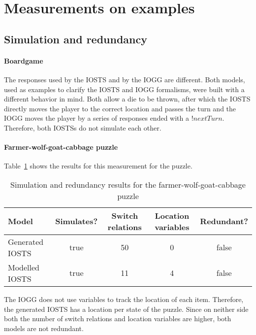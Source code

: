 \section{Measurements on examples}

\subsection{Simulation and redundancy}

\paragraph*{Boardgame}
The responses used by the IOSTS and by the IOGG are different. Both models, used as examples to clarify the IOSTS and IOGG formalisms, were built with a different behavior in mind. Both allow a die to be thrown, after which the IOSTS directly moves the player to the correct location and passes the turn and the IOGG moves the player by a series of responses ended with a $!nextTurn$. Therefore, both IOSTSs do not simulate each other.

\paragraph*{Farmer-wolf-goat-cabbage puzzle}
Table~\ref{tab:fwgc-simulate} shows the results for this measurement for the puzzle. 

\begin{table}[ht]
\begin{center}
\begin{tabular}{|l|c|c|c|c|}
\hline
\textbf{Model} & \textbf{Simulates?} & \textbf{Switch relations} & \textbf{Location variables} & \textbf{Redundant?} \\ \hline
Generated IOSTS & true & 50 & 0 & false \\ \hline
Modelled IOSTS & true & 11 & 4 & false \\ \hline
\end{tabular}
\end{center}
\caption{Simulation and redundancy results for the farmer-wolf-goat-cabbage puzzle}
\label{tab:fwgc-simulate}
\end{table}

The IOGG does not use variables to track the location of each item. Therefore, the generated IOSTS has a location per state of the puzzle. Since on neither side both the number of switch relations and location variables are higher, both models are not redundant.

